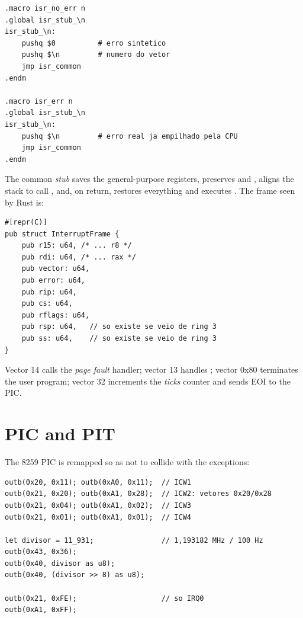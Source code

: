 \begin{lstlisting}[caption={Stubs that normalize the error code.},label={lst:isrstubs}]
.macro isr_no_err n
.global isr_stub_\n
isr_stub_\n:
    pushq $0          # erro sintetico
    pushq $\n         # numero do vetor
    jmp isr_common
.endm

.macro isr_err n
.global isr_stub_\n
isr_stub_\n:
    pushq $\n         # erro real ja empilhado pela CPU
    jmp isr_common
.endm
\end{lstlisting}

The common \emph{stub} saves the general-purpose registers, preserves
 and , aligns the stack to call
, and, on return, restores everything and executes
. The frame seen by Rust is:

\begin{lstlisting}[caption={Layout of \code{InterruptFrame} after the common stub.},label={lst:frame}]
#[repr(C)]
pub struct InterruptFrame {
    pub r15: u64, /* ... r8 */
    pub rdi: u64, /* ... rax */
    pub vector: u64,
    pub error: u64,
    pub rip: u64,
    pub cs: u64,
    pub rflags: u64,
    pub rsp: u64,   // so existe se veio de ring 3
    pub ss: u64,    // so existe se veio de ring 3
}
\end{lstlisting}

Vector 14 calls the \emph{page fault} handler; vector 13 handles
; vector 0x80 terminates the user program; vector 32
increments the \emph{ticks} counter and sends EOI to the PIC.

\section{PIC and PIT}

The 8259 PIC is remapped so as not to collide with the exceptions:

\begin{lstlisting}[caption={PIC remapping and PIT initialization.},label={lst:picpit}]
outb(0x20, 0x11); outb(0xA0, 0x11);  // ICW1
outb(0x21, 0x20); outb(0xA1, 0x28);  // ICW2: vetores 0x20/0x28
outb(0x21, 0x04); outb(0xA1, 0x02);  // ICW3
outb(0x21, 0x01); outb(0xA1, 0x01);  // ICW4

let divisor = 11_931;                // 1,193182 MHz / 100 Hz
outb(0x43, 0x36);
outb(0x40, divisor as u8);
outb(0x40, (divisor >> 8) as u8);

outb(0x21, 0xFE);                    // so IRQ0
outb(0xA1, 0xFF);
\end{lstlisting}

